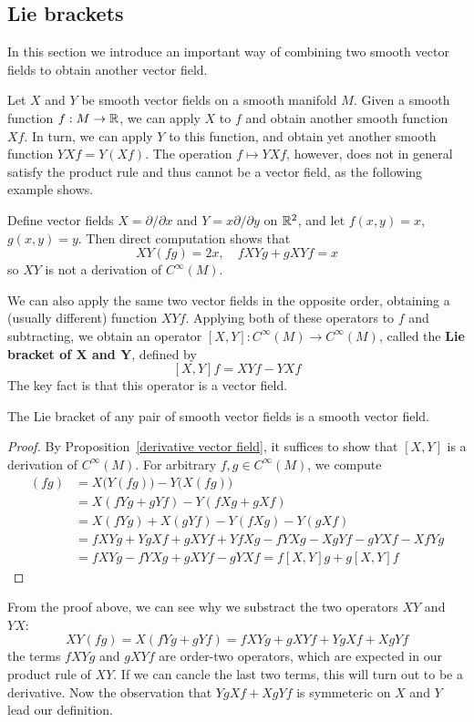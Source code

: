 \subsection{Lie brackets}
In this section we introduce an important way of combining two smooth vector fields to obtain another vector field.\par
Let $X$ and $Y$ be smooth vector fields on a smooth manifold $M$. Given a smooth function $f:M\to\mathbb{R}$, we can apply $X$ to $f$ and obtain another smooth function $Xf $. In turn, we can apply $Y$ to this function, and obtain yet another smooth function $YXf=Y(Xf)$. The operation $f\mapsto YXf$, however, does not in general satisfy the product rule and thus cannot be a vector field, as the following example shows.
\begin{example}
Define vector fields $X=\partial/\partial x$ and $Y=x\partial/\partial y$ on $\mathbb{R}^2$, and let $f(x,y)=x$, $g(x,y)=y$. Then direct computation shows that 
\[XY(fg)=2x,\quad fXYg+gXYf=x\]
so $XY$ is not a derivation of $C^\infty(M)$.
\end{example}
We can also apply the same two vector fields in the opposite order, obtaining a (usually different) function $XYf$. Applying both of these operators to $f$ and subtracting, we obtain an operator $[X,Y]:C^\infty(M)\to C^\infty(M)$, called the \textbf{Lie bracket of $\bm{X}$ and $\bm{Y}$}, defined by
\[[X,Y]f=XYf-YXf\]
The key fact is that this operator is a vector field.
\begin{lemma}
The Lie bracket of any pair of smooth vector fields is a smooth vector field.
\end{lemma}
\begin{proof}
By Proposition~\ref{derivative vector field}, it suffices to show that $[X,Y]$ is a derivation of $C^\infty(M)$. For arbitrary $f,g\in C^\infty(M)$, we compute
\begin{align*}
[X,Y](fg)&=X\big(Y(fg)\big)-Y\big(X(fg)\big)\\
&=X(fYg+gYf)-Y(fXg+gXf)\\
&=X(fYg)+X(gYf)-Y(fXg)-Y(gXf)\\
&=fXYg+YgXf+gXYf+YfXg-fYXg-XgYf-gYXf-XfYg\\
&=fXYg-fYXg+gXYf-gYXf=f[X,Y]g+g[X,Y]f
\end{align*}
\end{proof}
\begin{remark}
From the proof above, we can see why we substract the two operators $XY$ and $YX$: 
\[XY(fg)=X(fYg+gYf)=fXYg+gXYf+YgXf+XgYf\]
the terms $fXYg$ and $gXYf$ are order-two operators, which are expected in our product rule of $XY$. If we can cancle the last two terms, this will turn out to be a derivative. Now the observation that $YgXf+XgYf$ is symmeteric on $X$ and $Y$ lead our definition.
\end{remark}
